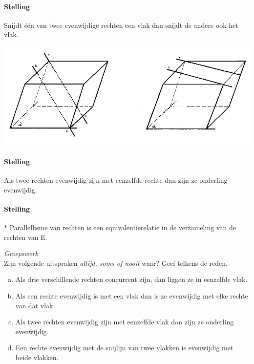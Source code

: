 \documentclass[12pt,twoside]{article}
\begin{document}
\paragraph*{Stelling}
Snijdt één van twee evenwijdige rechten een vlak dan snijdt de andere ook het vlak.
\begin{center}
  \includegraphics[width=\textwidth]{stelling_4}
\end{center}


\paragraph*{Stelling}
Als twee rechten evenwijdig zijn met eenzelfde rechte dan zijn ze onderling evenwijdig.

\paragraph*{Stelling}*
Parallellisme van rechten is een equivalentierelatie in de verzameling van de rechten van E.



\begin{oefening} {\em Groepswerk}\\
Zijn volgende uitspraken {\em altijd, soms of nooit} waar? Geef telkens de reden.
\begin{enumerate}[(a)]
  \item Als drie verschillende rechten concurrent zijn, dan liggen ze in eenzelfde vlak.
  \item Als een rechte evenwijdig is met een vlak dan is ze evenwijdig met elke rechte van dat vlak.
  \item Als twee rechten evenwijdig zijn met eenzelfde vlak dan zijn ze onderling evenwijdig.
  \item Een rechte evenwijdig met de snijlijn van twee vlakken is evenwijdig met beide vlakken.
\end{enumerate}
\end{oefening}
\end{document}
